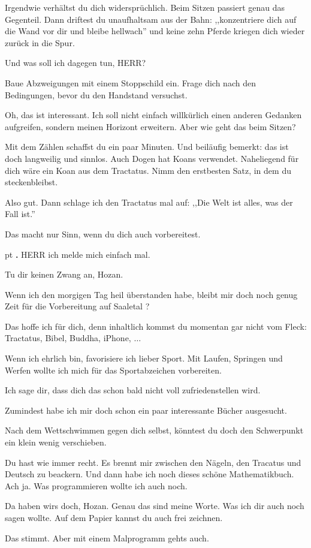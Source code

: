 \documentclass[10pt,a4paper]{article}
\newcounter{notec}
\newcommand\notep[1]{%
  \stepcounter{notec}
  \vskip #1pt
  {\bf\arabic{notec}.}
}
\begin{document}
\begin{mdframed}[style=daystyle]
  \vskip 2pt
  Irgendwie verhältst du dich widersprüchlich. Beim Sitzen passiert genau das
  Gegenteil. Dann driftest du unaufhaltsam aus der Bahn: ,,konzentriere dich auf
  die Wand vor dir und bleibe hellwach'' und keine zehn Pferde kriegen dich
  wieder zurück in die Spur.

  \vskip 2pt
  Und was soll ich dagegen tun, HERR?

  \vskip 2pt
  Baue Abzweigungen mit einem Stoppschild ein. Frage dich nach den Bedingungen,
  bevor du den Handstand versuchst.

  \vskip 2pt
  Oh, das ist interessant. Ich soll nicht einfach willkürlich einen anderen
  Gedanken aufgreifen, sondern meinen Horizont erweitern. Aber wie geht das beim
  Sitzen?

  \vskip 2pt
  Mit dem Zählen schaffst du ein paar Minuten. Und beiläufig bemerkt: das ist
  doch langweilig und sinnlos. Auch Dogen hat Koans verwendet. Naheliegend für
  dich wäre ein Koan aus dem Tractatus. Nimm den erstbesten Satz, in dem du
  steckenbleibst.

  \vskip 2pt
  Also gut. Dann schlage ich den Tractatus mal auf: ,,Die Welt ist alles, was
  der Fall ist.''

  \vskip 2pt
  Das macht nur Sinn, wenn du dich auch vorbereitest.


  \notep 4 HERR ich melde mich einfach mal.

  \vskip 2pt
  Tu dir keinen Zwang an, Hozan.
  
  \vskip 2pt
  Wenn ich den morgigen Tag heil überstanden habe, bleibt mir doch noch genug
  Zeit für die Vorbereitung auf Saaletal ?
  
  \vskip 2pt
  Das hoffe ich für dich, denn inhaltlich kommst du momentan gar nicht vom
  Fleck: Tractatus, Bibel, Buddha, iPhone, $\ldots$
  
  \vskip 2pt
  Wenn ich ehrlich bin, favorisiere ich lieber Sport. Mit Laufen, Springen und
  Werfen wollte ich mich für das Sportabzeichen vorbereiten.
  
  \vskip 2pt
  Ich sage dir, dass dich das schon bald nicht voll zufriedenstellen wird.
  
  \vskip 2pt
  Zumindest habe ich mir doch schon ein paar interessante Bücher ausgesucht.
  
  \vskip 2pt
  Nach dem Wettschwimmen gegen dich selbst, könntest du doch den Schwerpunkt ein
  klein wenig verschieben.
  
  \vskip 2pt
  Du hast wie immer recht. Es brennt mir zwischen den Nägeln, den Tracatus und
  Deutsch zu beackern. Und dann habe ich noch dieses schöne Mathematikbuch. Ach
  ja. Was programmieren wollte ich auch noch.
  
  \vskip 2pt
  Da haben wirs doch, Hozan. Genau das sind meine Worte. Was ich dir auch noch
  sagen wollte. Auf dem Papier kannst du auch frei zeichnen.
  
  \vskip 2pt
  Das stimmt. Aber mit einem Malprogramm gehts auch.
  
\end{mdframed}
\end{document}

